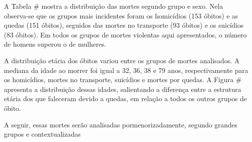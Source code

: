 A Tabela \# mostra a distribuição das mortes segundo grupo e sexo. Nela observa-se que os grupos mais incidentes foram os homicídios (153 óbitos) e as quedas (151 óbitos), seguidos das mortes no transporte (93 óbitos) e os suicídios (83 óbitos). Em todos os grupos de mortes violentas aqui apresentados, o número de homens superou o de mulheres.

A distribuição etária dos óbitos variou entre os grupos de mortes analisados. A mediana da idade ao morrer foi igual a 32, 36, 38 e 79 anos, respectivamente para os homicídios, mortes no transporte, suicídios e mortes por quedas. A Figura \# apresenta a distribuição dessas idades, salientando a diferença entre a estrutura etária dos que faleceram devido a quedas, em relação a todos os outros grupos de óbito.

A seguir, essas mortes serão analisadas pormenorizadamente, segundo grandes grupos e contextualizadas